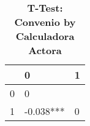 \begin{table}[H]\centering \caption{\textbf{T-Test: Convenio by Calculadora Actora}}
\begin{tabular}{l*{2}{l}}
\toprule
                     & 0            & 1\\\midrule
0             &      0                   \\
1             & -0.038***    &      0    \\
\bottomrule\end{tabular}
\end{table}
